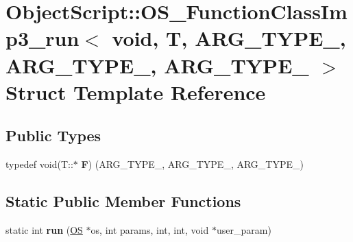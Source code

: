 \hypertarget{struct_object_script_1_1_o_s___function_class_imp3__run_3_01void_00_01_t_00_01_01_01_a_r_g___t_yc72388c50c7f1d721a6778d52ce417ea}{}\section{Object\+Script\+:\+:O\+S\+\_\+\+Function\+Class\+Imp3\+\_\+run$<$ void, T, A\+R\+G\+\_\+\+T\+Y\+P\+E\+\_, A\+R\+G\+\_\+\+T\+Y\+P\+E\+\_, A\+R\+G\+\_\+\+T\+Y\+P\+E\+\_ $>$ Struct Template Reference}
\label{struct_object_script_1_1_o_s___function_class_imp3__run_3_01void_00_01_t_00_01_01_01_a_r_g___t_yc72388c50c7f1d721a6778d52ce417ea}
\subsection*{Public Types}
\begin{DoxyCompactItemize}
\item 
typedef void(T\+::$\ast$ {\bfseries F}) (A\+R\+G\+\_\+\+T\+Y\+P\+E\+\_, A\+R\+G\+\_\+\+T\+Y\+P\+E\+\_, A\+R\+G\+\_\+\+T\+Y\+P\+E\+\_)\hypertarget{struct_object_script_1_1_o_s___function_class_imp3__run_3_01void_00_01_t_00_01_01_01_a_r_g___t_yc72388c50c7f1d721a6778d52ce417ea_ab278c320e43b224149462a32a38c83ff}{}\label{struct_object_script_1_1_o_s___function_class_imp3__run_3_01void_00_01_t_00_01_01_01_a_r_g___t_yc72388c50c7f1d721a6778d52ce417ea_ab278c320e43b224149462a32a38c83ff}

\end{DoxyCompactItemize}
\subsection*{Static Public Member Functions}
\begin{DoxyCompactItemize}
\item 
static int {\bfseries run} (\hyperlink{class_object_script_1_1_o_s}{OS} $\ast$os, int params, int, int, void $\ast$user\+\_\+param)\hypertarget{struct_object_script_1_1_o_s___function_class_imp3__run_3_01void_00_01_t_00_01_01_01_a_r_g___t_yc72388c50c7f1d721a6778d52ce417ea_afea07d3e49732c66053a0950640bae38}{}\label{struct_object_script_1_1_o_s___function_class_imp3__run_3_01void_00_01_t_00_01_01_01_a_r_g___t_yc72388c50c7f1d721a6778d52ce417ea_afea07d3e49732c66053a0950640bae38}

\end{DoxyCompactItemize}


